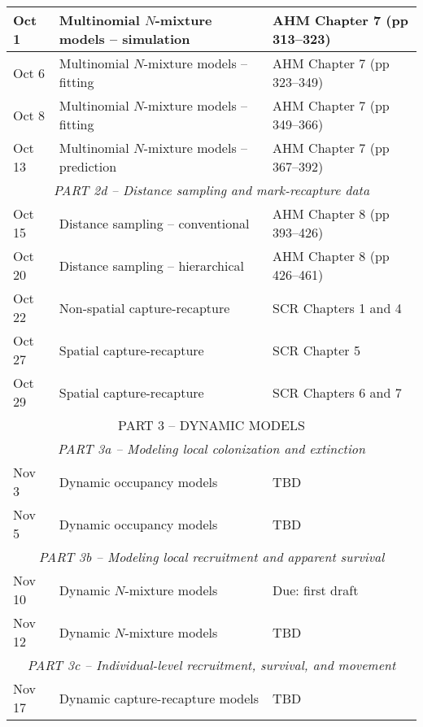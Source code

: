 \documentclass[12pt]{article}
\begin{document}
\begin{center}
\begin{tabular}[c]{lll}
\hline
Oct 1      & Multinomial $N$-mixture models -- simulation & AHM Chapter 7 (pp 313--323)      \\
\hline
Oct 6      & Multinomial $N$-mixture models -- fitting    & AHM Chapter 7 (pp 323--349)      \\
Oct 8      & Multinomial $N$-mixture models -- fitting    & AHM Chapter 7 (pp 349--366)      \\
\hline
Oct 13     & Multinomial $N$-mixture models -- prediction & AHM Chapter 7 (pp 367--392)      \\
\hline
           \multicolumn{3}{c}{\it PART 2d -- Distance sampling and mark-recapture data} \\
\hline
Oct 15     & Distance sampling -- conventional            & AHM Chapter 8 (pp 393--426)      \\
\hline
Oct 20     & Distance sampling -- hierarchical            & AHM Chapter 8 (pp 426--461)      \\
Oct 22     & Non-spatial capture-recapture                & SCR Chapters 1 and 4             \\
\hline
Oct 27     & Spatial capture-recapture                    & SCR Chapter 5                    \\
Oct 29     & Spatial capture-recapture                    & SCR Chapters 6 and 7             \\
\hline
           \multicolumn{3}{c}{PART 3 -- DYNAMIC MODELS}                                    \\
           \multicolumn{3}{c}{\it PART 3a -- Modeling local colonization and extinction} \\
\hline
Nov 3      & Dynamic occupancy models                     & TBD                              \\
Nov 5      & Dynamic occupancy models                     & TBD                              \\
\hline
           \multicolumn{3}{c}{\it PART 3b -- Modeling local recruitment and apparent survival} \\
\hline
Nov 10     & Dynamic $N$-mixture models                   & Due: first draft                 \\
Nov 12     & Dynamic $N$-mixture models                   & TBD                              \\
\hline
           \multicolumn{3}{c}{\it PART 3c -- Individual-level recruitment, survival, and movement} \\
\hline
Nov 17     & Dynamic capture-recapture models             & TBD                              \\

\end{tabular}
\end{center}
\end{document}

